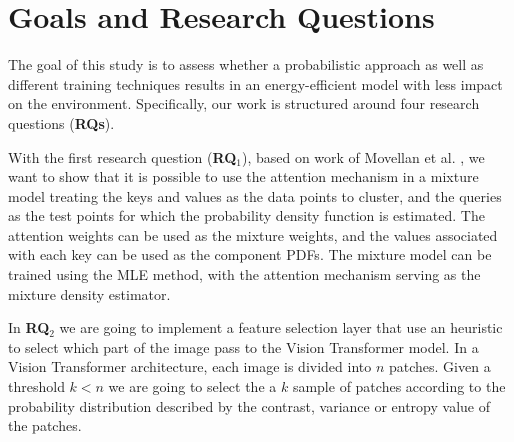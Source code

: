 \section{Goals and Research Questions}
\label{goal}
The goal of this study is to assess whether a probabilistic approach as well as different training techniques results in an energy-efficient model with less impact on the environment. Specifically, our work is structured around four
research questions (\textbf{RQs}).

\medskip


\medskip
{}

\medskip
{}

\medskip

With the first research question (\textbf{RQ$_{1}$}), based on work of Movellan et al. \cite{DBLP:journals/corr/abs-2010-15583}, we want to show that it is possible to use the attention mechanism in a mixture model treating the keys and values as the data points to cluster, and the queries as the test points for which the probability density function is estimated. The attention weights can be used as the mixture weights, and the values associated with each key can be used as the component PDFs. The mixture model can be trained using the MLE method, with the attention mechanism serving as the mixture density estimator. 

In \textbf{RQ$_{2}$} we are going to implement a feature selection layer that use an heuristic to select which part of the image pass to the Vision Transformer model. In a Vision Transformer architecture, each image is divided into $n$ patches. Given a threshold $k < n$ we are going to select the a $k$ sample of patches according to the probability distribution described by the contrast, variance or entropy value of the patches.

